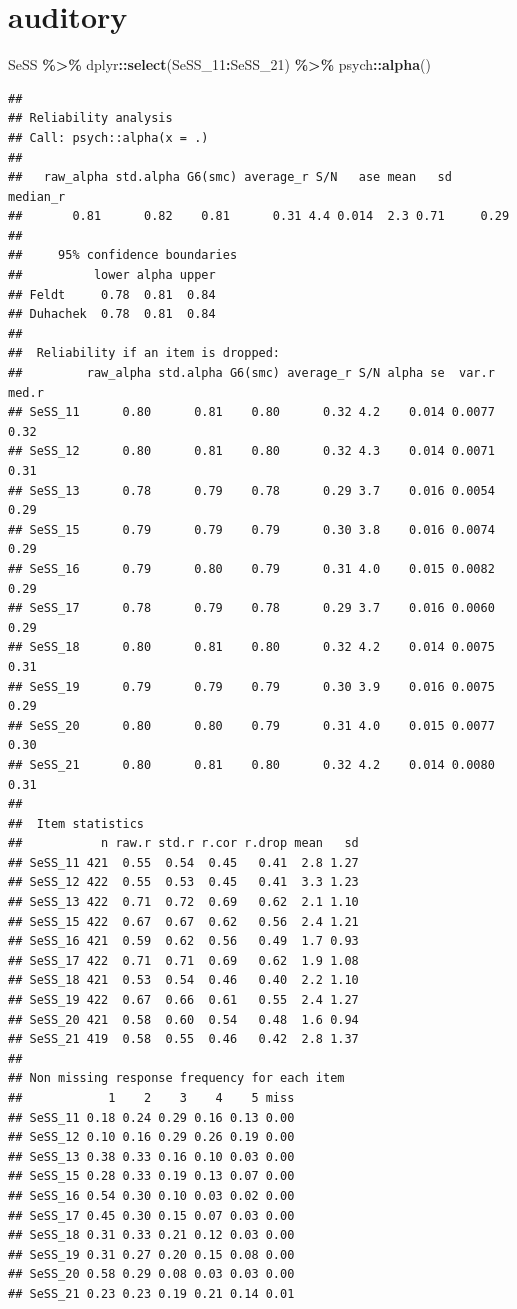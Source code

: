 \documentclass[
]{article}
\newenvironment{Shaded}{\begin{snugshade}}{\end{snugshade}}
\newcommand{\FunctionTok}[1]{\textcolor[rgb]{0.13,0.29,0.53}{\textbf{#1}}}
\newcommand{\NormalTok}[1]{#1}
\newcommand{\SpecialCharTok}[1]{\textcolor[rgb]{0.81,0.36,0.00}{\textbf{#1}}}
\begin{document}
\section{auditory}\label{auditory}

\begin{Shaded}
\begin{Highlighting}[]
\NormalTok{SeSS }\SpecialCharTok{\%\textgreater{}\%}\NormalTok{ dplyr}\SpecialCharTok{::}\FunctionTok{select}\NormalTok{(SeSS\_11}\SpecialCharTok{:}\NormalTok{SeSS\_21) }\SpecialCharTok{\%\textgreater{}\%}\NormalTok{ psych}\SpecialCharTok{::}\FunctionTok{alpha}\NormalTok{()}
\end{Highlighting}
\end{Shaded}

\begin{verbatim}
## 
## Reliability analysis   
## Call: psych::alpha(x = .)
## 
##   raw_alpha std.alpha G6(smc) average_r S/N   ase mean   sd median_r
##       0.81      0.82    0.81      0.31 4.4 0.014  2.3 0.71     0.29
## 
##     95% confidence boundaries 
##          lower alpha upper
## Feldt     0.78  0.81  0.84
## Duhachek  0.78  0.81  0.84
## 
##  Reliability if an item is dropped:
##         raw_alpha std.alpha G6(smc) average_r S/N alpha se  var.r med.r
## SeSS_11      0.80      0.81    0.80      0.32 4.2    0.014 0.0077  0.32
## SeSS_12      0.80      0.81    0.80      0.32 4.3    0.014 0.0071  0.31
## SeSS_13      0.78      0.79    0.78      0.29 3.7    0.016 0.0054  0.29
## SeSS_15      0.79      0.79    0.79      0.30 3.8    0.016 0.0074  0.29
## SeSS_16      0.79      0.80    0.79      0.31 4.0    0.015 0.0082  0.29
## SeSS_17      0.78      0.79    0.78      0.29 3.7    0.016 0.0060  0.29
## SeSS_18      0.80      0.81    0.80      0.32 4.2    0.014 0.0075  0.31
## SeSS_19      0.79      0.79    0.79      0.30 3.9    0.016 0.0075  0.29
## SeSS_20      0.80      0.80    0.79      0.31 4.0    0.015 0.0077  0.30
## SeSS_21      0.80      0.81    0.80      0.32 4.2    0.014 0.0080  0.31
## 
##  Item statistics 
##           n raw.r std.r r.cor r.drop mean   sd
## SeSS_11 421  0.55  0.54  0.45   0.41  2.8 1.27
## SeSS_12 422  0.55  0.53  0.45   0.41  3.3 1.23
## SeSS_13 422  0.71  0.72  0.69   0.62  2.1 1.10
## SeSS_15 422  0.67  0.67  0.62   0.56  2.4 1.21
## SeSS_16 421  0.59  0.62  0.56   0.49  1.7 0.93
## SeSS_17 422  0.71  0.71  0.69   0.62  1.9 1.08
## SeSS_18 421  0.53  0.54  0.46   0.40  2.2 1.10
## SeSS_19 422  0.67  0.66  0.61   0.55  2.4 1.27
## SeSS_20 421  0.58  0.60  0.54   0.48  1.6 0.94
## SeSS_21 419  0.58  0.55  0.46   0.42  2.8 1.37
## 
## Non missing response frequency for each item
##            1    2    3    4    5 miss
## SeSS_11 0.18 0.24 0.29 0.16 0.13 0.00
## SeSS_12 0.10 0.16 0.29 0.26 0.19 0.00
## SeSS_13 0.38 0.33 0.16 0.10 0.03 0.00
## SeSS_15 0.28 0.33 0.19 0.13 0.07 0.00
## SeSS_16 0.54 0.30 0.10 0.03 0.02 0.00
## SeSS_17 0.45 0.30 0.15 0.07 0.03 0.00
## SeSS_18 0.31 0.33 0.21 0.12 0.03 0.00
## SeSS_19 0.31 0.27 0.20 0.15 0.08 0.00
## SeSS_20 0.58 0.29 0.08 0.03 0.03 0.00
## SeSS_21 0.23 0.23 0.19 0.21 0.14 0.01
\end{verbatim}
\end{document}
